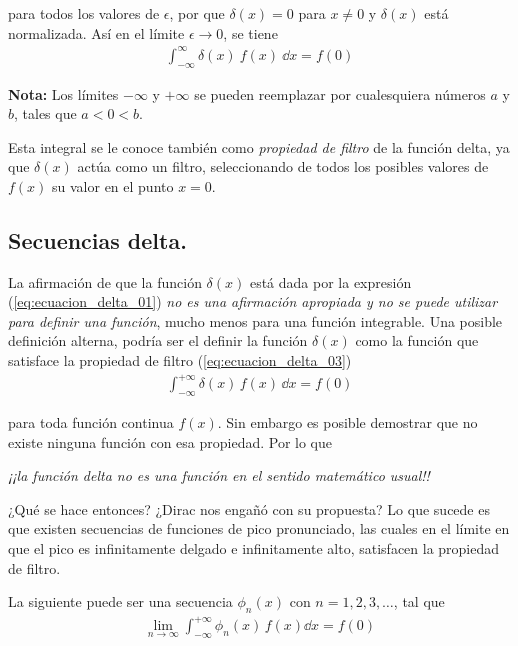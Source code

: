 para todos los valores de $\epsilon$, por que $\delta (x) = 0$ para $x \neq 0$ y $\delta (x)$ está normalizada. Así en el límite $\epsilon \to 0$, se tiene
\begin{align*}
\int_{-\infty}^{\infty} \delta (x) \: f(x) \: \dd{x} = f(0)
\end{align*}

\textbf{Nota: } Los límites $-\infty$ y $+\infty$ se pueden reemplazar por cualesquiera números $a$ y $b$, tales que $a < 0 < b$.
\par
Esta integral se le conoce también como \emph{propiedad de filtro} de la función delta, ya que $\delta (x)$ actúa como un filtro, seleccionando de todos los posibles valores de $f(x)$ su valor en el punto $x=0$.

\subsection{Secuencias delta.}\label{secuencias_delta}

La afirmación de que la función $\delta (x)$ está dada por la expresión (\ref{eq:ecuacion_delta_01}) \textit{no es una afirmación apropiada y no se puede utilizar para definir una función}, mucho menos para una función integrable. Una posible definición alterna, podría ser el definir la función $\delta (x)$ como la función que satisface la propiedad de filtro (\ref{eq:ecuacion_delta_03})
\begin{align*}
\int_{-\infty}^{+ \infty} \delta (x) \, f(x) \, \dd{x} = f(0)
\end{align*}

para toda función continua $f(x)$. Sin embargo es posible demostrar que no existe ninguna función con esa propiedad. Por lo que 
\begin{center}
\textit{¡¡la función delta no es una función en el sentido matemático usual!!}
\end{center}

¿Qué se hace entonces?  ¿Dirac nos engañó con su propuesta? Lo que sucede es que existen secuencias de funciones de pico pronunciado, las cuales en el límite en que el pico es infinitamente delgado e infinitamente alto, satisfacen la propiedad de filtro.
\par
La siguiente puede ser una secuencia $\phi_{n} (x)$ con $n = 1, 2, 3, \ldots$, tal que
\begin{align*}
\lim_{n \to \infty} \int_{-\infty}^{+ \infty} \phi_{n}(x) \, f(x) \dd{x} =  f(0)
\end{align*}

